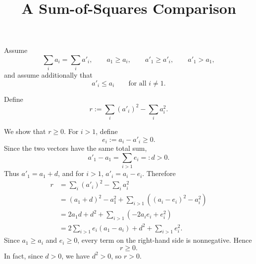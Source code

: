 \documentclass[11pt]{article}
\title{A Sum-of-Squares Comparison}
\author{}
\date{}
\begin{document}
\maketitle



Assume
\[
\sum_i a_i=\sum_i a'_i,\qquad
a_1\ge a_i,\qquad a'_1\ge a'_i,\qquad a'_1>a_1,
\]
and assume additionally that
\[
a'_i\le a_i \qquad \text{for all } i\ne 1.
\]

Define
\[
r:=\sum_i (a'_i)^2-\sum_i a_i^2.
\]

We show that \(r\ge 0\). For \(i>1\), define
\[
e_i:=a_i-a'_i\ge 0.
\]
Since the two vectors have the same total sum,
\[
a'_1-a_1=\sum_{i>1}e_i=:d>0.
\]
Thus \(a'_1=a_1+d\), and for \(i>1\), \(a'_i=a_i-e_i\). Therefore
\[
\begin{aligned}
r
&=\sum_i (a'_i)^2-\sum_i a_i^2\\
&=(a_1+d)^2-a_1^2
  +\sum_{i>1}\left((a_i-e_i)^2-a_i^2\right)\\
&=2a_1d+d^2+\sum_{i>1}\left(-2a_i e_i+e_i^2\right)\\
&=2\sum_{i>1}e_i(a_1-a_i)+d^2+\sum_{i>1}e_i^2.
\end{aligned}
\]
Since \(a_1\ge a_i\) and \(e_i\ge 0\), every term on the right-hand
side is nonnegative. Hence
\[
r\ge 0.
\]
In fact, since \(d>0\), we have \(d^2>0\), so \(r>0\).
\end{document}

